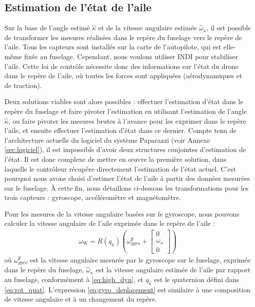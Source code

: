\subsection{Estimation de l'état de l'aile}

Sur la base de l'angle estimé $\hat{\kappa}$ et de la vitesse angulaire estimée $\hat{\omega}_{\kappa}$, il est possible de transformer les mesures réalisées dans le repère du fuselage vers le repère de l'aile. Tous les capteurs sont installés sur la carte de l'autopilote, qui est elle-même fixée au fuselage. Cependant, nous voulons utiliser INDI pour stabiliser l'aile. Cette loi de contrôle nécessite donc des informations sur l'état du drone dans le repère de l'aile, où toutes les forces sont appliquées (aérodynamiques et de traction).

Deux solutions viables sont alors possibles : effectuer l'estimation d'état dans le repère du fuselage et faire pivoter l'estimation en utilisant l'estimation de l'angle $\hat{\kappa}$, ou faire pivoter les mesures brutes à l'avance pour les exprimer dans le repère l'aile, et ensuite effectuer l'estimation d'état dans ce dernier. 
Compte tenu de l'architecture actuelle du logiciel du système Paparazzi (voir Annexe \ref{sec:logiciel}), il est impossible d'avoir deux structures conjointes d'estimation de l'état. Il est donc complexe de mettre en œuvre la première solution, dans laquelle le contrôleur récupère directement l'estimation de l'état actuel. C'est pourquoi nous avons choisi d'estimer l'état de l'aile à partir des données mesurées sur le fuselage. À cette fin, nous détaillons ci-dessous les transformations pour les trois capteurs : gyroscope, accéléromètre et magnétomètre. 

Pour les mesures de la vitesse angulaire basées sur le gyroscope, nous pouvons calculer la vitesse angulaire de l'aile exprimée dans le repère de l'aile :
\begin{align}
    \label{eq:gyro_deplacement}
    \omega_{\text{W}} = R(q_{\hat{\kappa}}) \left( \omega_{gyro}^{\text{F}} + \begin{bmatrix}
    0\\ \omega_{\kappa} \\ 0
    \end{bmatrix}  \right) 
\end{align}
où $\omega_{gyro}^{\text{F}}$ est la vitesse angulaire mesurée par le gyroscope sur le fuselage, exprimée dans le repère du fuselage, $\hat{\omega}_{\kappa}$ est la vitesse angulaire estimée de l'aile par rapport au fuselage, conformément à \eqref{eq:high_dyn}, et $q_{\hat{\kappa}}$ est le quaternion défini dans \eqref{eq:rot_quat}.
L'expression \eqref{eq:gyro_deplacement} est similaire à une composition de vitesse angulaire et à un changement du repère.

